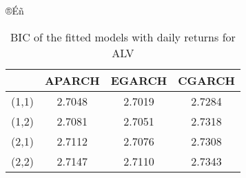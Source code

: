 \begin{table}[!h]
 \small
  ®Éñ 
  \vspace{2ex} 
\begin{tabular}{c|c|c|c}
\toprule
	         &	APARCH	& EGARCH	& CGARCH	\\
\midrule
\hline		 

(1,1)&	2.7048	& 2.7019	&2.7284	 \\
(1,2)&	2.7081	& 2.7051	&2.7318	 \\
(2,1)&	2.7112	& 2.7076	&2.7308	 \\
(2,2)&	2.7147	& 2.7110	&2.7343	 \\
\bottomrule

\end{tabular}
  \caption{BIC of the fitted models with daily returns for ALV}
  \label{tab:dailyBICforALV}
\end{table}




